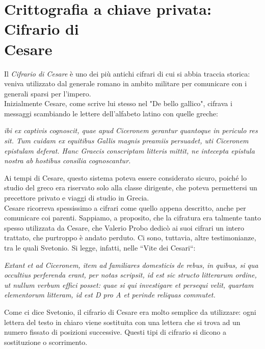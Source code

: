 \documentclass[italian,A4,12pt]{article}
\begin{document}
    \section{Crittografia a chiave privata: Cifrario di \\Cesare}
    Il \textit{Cifrario di Cesare} è uno dei più antichi cifrari di cui si abbia traccia storica: veniva utilizzato dal generale romano in ambito militare per comunicare con i generali sparsi per l'impero.\\
    Inizialmente Cesare, come scrive lui stesso nel "De bello gallico", cifrava i messaggi scambiando le lettere dell'alfabeto latino con quelle greche:
    \begin{displayquote}
      \textit{ibi ex captivis cognoscit, quae apud Ciceronem gerantur quantoque in periculo res sit.
      Tum cuidam ex equitibus Gallis magnis preamiis persuadet, uti Ciceronem epistulam deferat.
      Hanc Graecis conscriptam litteris mittit, ne intecepta epistula nostra ab hostibus consilia cognoscantur.}
    \end{displayquote}
    Ai tempi di Cesare, questo sistema poteva essere considerato sicuro, poiché lo studio del greco era riservato solo alla classe dirigente, che poteva permettersi un precettore privato e viaggi di studio in Grecia.\\
    Cesare ricorreva spessissimo a cifrari come quello appena descritto, anche per comunicare coi parenti. Sappiamo, a proposito, che la cifratura era talmente tanto spesso utilizzata da Cesare, che Valerio Probo dedicò ai suoi cifrari un intero trattato, che purtroppo è andato perduto. Ci sono, tuttavia, altre testimonianze, tra le quali Svetonio. Si legge, infatti, nelle “Vite dei Cesari“:
    \begin{displayquote}
      \textit{Extant et ad Ciceronem, item ad familiares domesticis de rebus, in quibus, si qua occultius perferenda erant, per notas scripsit, id est sic structo litterarum ordine, ut nullum verbum effici posset: quae si qui investigare et persequi velit, quartam elementorum litteram, id est D pro A et perinde reliquas commutet.\\}
    \end{displayquote}
    Come ci dice Svetonio, il cifrario di Cesare era molto semplice da utilizzare: ogni lettera del testo in chiaro viene sostituita con una lettera che si trova ad un numero fissato di posizioni successive. Questi tipi di cifrario si dicono a sostituzione o scorrimento.\\
\end{document}
